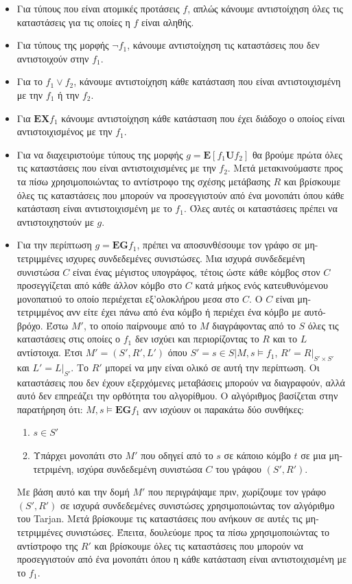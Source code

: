 \documentclass{article}
\newcommand{\english}[1]{\foreignlanguage{english}{{#1}}}
\begin{document}
\begin{itemize}
    \item Για τύπους που είναι ατομικές προτάσεις $f$, απλώς κάνουμε αντιστοίχηση όλες τις καταστάσεις για τις οποίες η $f$ είναι αληθής.
    \item Για τύπους της μορφής $\neg f_1$, κάνουμε αντιστοίχηση τις καταστάσεις που δεν αντιστοιχούν στην $f_1$.
    \item Για το $f_1 \vee f_2$, κάνουμε αντιστοίχηση κάθε κατάσταση που είναι αντιστοιχισμένη με την $f_1$ ή την $f_2$. 
    \item Για $\mathbf{EX} f_1$ κάνουμε αντιστοίχηση κάθε κατάσταση που έχει διάδοχο ο οποίος είναι αντιστοιχισμένος με την $f_1$.
    \item Για να διαχειριστούμε τύπους της μορφής $g = \mathbf{E}[f_1 \mathbf{U} f_2]$ θα βρούμε πρώτα όλες τις καταστάσεις που είναι αντιστοιχισμένες με την $f_2$. Μετά μετακινούμαστε προς τα πίσω χρησιμοποιώντας το αντίστροφο της σχέσης μετάβασης $R$ και βρίσκουμε όλες τις καταστάσεις που μπορούν να προσεγγιστούν από ένα μονοπάτι όπου κάθε κατάσταση είναι αντιστοιχισμένη με το $f_1$. Όλες αυτές οι καταστάσεις πρέπει να αντιστοιχηστούν με $g$.
    \item Για την περίπτωση $g = \mathbf{EG} f_1$, πρέπει να αποσυνθέσουμε τον γράφο σε μη-τετριμμένες ισχυρες συνδεδεμένες συνιστώσες. Μια ισχυρά συνδεδεμένη συνιστώσα $C$ είναι ένας μέγιστος υπογράφος, τέτοις ώστε κάθε κόμβος στον $C$ προσεγγίζεται από κάθε άλλον κόμβο στο $C$ κατά μήκος ενός κατευθυνόμενου μονοπατιού το οποίο περιέχεται εξ'ολοκλήρου μεσα στο $C$. Ο $C$ είναι μη-τετριμμένος ανν είτε έχει πάνω από ένα κόμβο ή περιέχει ένα κόμβο με αυτό-βρόχο. Έστω $M'$, το οποίο παίρνουμε από το $M$ διαγράφοντας από το $S$ όλες τις καταστάσεις στις οποίες ο $f_1$ δεν ισχύει και περιορίζοντας το $R$ και το $L$ αντίστοιχα. Έτσι $M' = (S', R', L')$ όπου $S' = {s \in S | M, s \models f_1}$, $R' = R|_{S' \times S'}$ και $L' = L|_{S'}$. Το $R'$ μπορεί να μην είναι ολικό σε αυτή την περίπτωση. Οι καταστάσεις που δεν έχουν εξερχόμενες μεταβάσεις μπορούν να διαγραφούν, αλλά αυτό δεν επηρεάζει την ορθότητα του αλγορίθμου. Ο αλγόριθμος βασίζεται στην παρατήρηση ότι: $M, s \models \mathbf{EG} f_1$ ανν ισχύουν οι παρακάτω δύο συνθήκες:
    \begin{enumerate}
        \item $s \in S'$
        \item Υπάρχει μονοπάτι στο $M'$ που οδηγεί από το $s$ σε κάποιο κόμβο $t$  σε μια μη-τετριμένη, ισχύρα συνδεδεμένη συνιστώσα $C$ του γράφου $(S', R')$.
    \end{enumerate}
    Με βάση αυτό και την δομή $M'$ που περιγράψαμε πριν, χωρίζουμε τον γράφο $(S', R')$ σε ισχυρά συνδεδεμένες συνιστώσες χρησιμοποιώντας τον αλγόριθμο του \english{Tarjan}. Μετά βρίσκουμε τις καταστάσεις που ανήκουν σε αυτές τις μη-τετριμμένες συνιστώσες. Έπειτα, δουλεύομε προς τα πίσω χρησιμοποιώντας το αντίστροφο της $R'$ και βρίσκουμε όλες τις καταστάσεις που μπορούν να προσεγγιστούν από ένα μονοπάτι όπου η κάθε κατάσταση είναι αντιστοιχισμένη με το $f_1$.
\end{itemize}
\end{document}
